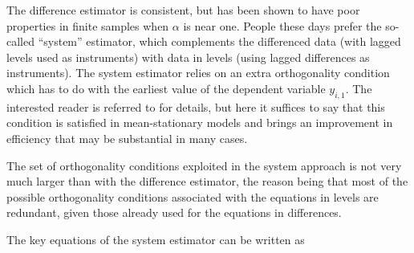 The difference estimator is consistent, but has been shown to have
poor properties in finite samples when $\alpha$ is near one. People
these days prefer the so-called ``system'' estimator, which
complements the differenced data (with lagged levels used as
instruments) with data in levels (using lagged differences as
instruments). The system estimator relies on an extra orthogonality
condition which has to do with the earliest value of the dependent
variable $y_{i,1}$. The interested reader is referred to \citet[pp.\
124--125]{blundell-bond98} for details, but here it suffices to say
that this condition is satisfied in mean-stationary models and brings
an improvement in efficiency that may be substantial in many cases.

The set of orthogonality conditions exploited in the system approach
is not very much larger than with the difference estimator,
the reason being that most of the possible orthogonality conditions
associated with the equations in levels are redundant, given those
already used for the equations in differences.

The key equations of the system estimator can be written as

